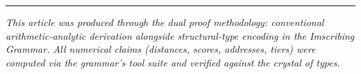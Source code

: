 \documentclass[12pt,a4paper]{article}
\begin{document}
\begin{center}
\rule{0.5\textwidth}{0.4pt}
\end{center}

\emph{This article was produced through the dual proof methodology: conventional arithmetic-analytic derivation alongside structural-type encoding in the Imscribing Grammar. All numerical claims (distances, scores, addresses, tiers) were computed via the grammar's tool suite and verified against the crystal of types.}
\end{document}
